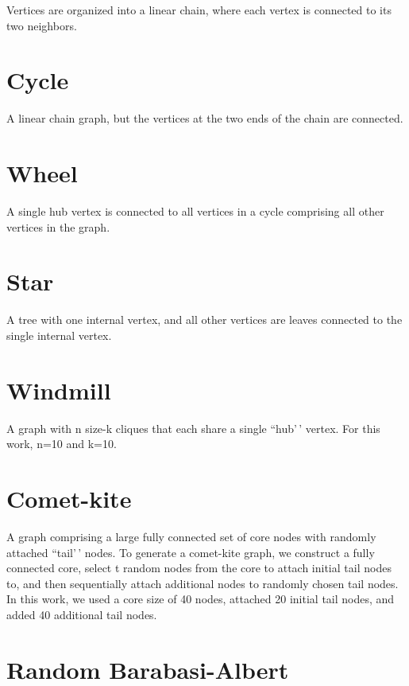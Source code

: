 \documentclass[
]{book}
\begin{document}
Vertices are organized into a linear chain, where each vertex is connected to its two neighbors.

\hypertarget{cycle}{%
\section{Cycle}\label{cycle}}

A linear chain graph, but the vertices at the two ends of the chain are connected.

\hypertarget{wheel}{%
\section{Wheel}\label{wheel}}

A single hub vertex is connected to all vertices in a cycle comprising all other vertices in the graph.

\hypertarget{star}{%
\section{Star}\label{star}}

A tree with one internal vertex, and all other vertices are leaves connected to the single internal vertex.

\hypertarget{windmill}{%
\section{Windmill}\label{windmill}}

A graph with n size-k cliques that each share a single ``hub'\,' vertex.
For this work, n=10 and k=10.

\hypertarget{comet-kite}{%
\section{Comet-kite}\label{comet-kite}}

A graph comprising a large fully connected set of core nodes with randomly attached ``tail'\,' nodes.
To generate a comet-kite graph, we construct a fully connected core, select t random nodes from the core to attach initial tail nodes to, and then sequentially attach additional nodes to randomly chosen tail nodes.
In this work, we used a core size of 40 nodes, attached 20 initial tail nodes, and added 40 additional tail nodes.

\hypertarget{random-barabasi-albert}{%
\section{Random Barabasi-Albert}\label{random-barabasi-albert}}
\end{document}
